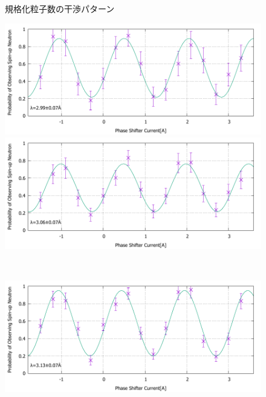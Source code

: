 \begin{figure}[h]
\begin{minipage}{0.5\hsize}
\end{minipage}
\caption{規格化粒子数の干渉パターン}\label{Discussion_fig_IF_nb}
\end{figure}

\begin{figure}[h]
\begin{minipage}{0.5\hsize}
\includegraphics[width=\hsize]{discussion/IF_rb/Interference_rb_fit420.pdf}
\end{minipage}
\begin{minipage}{0.5\hsize}
\includegraphics[width=\hsize]{discussion/IF_rb/Interference_rb_fit430.pdf}
\end{minipage}\\
\begin{minipage}{0.5\hsize}
\includegraphics[width=\hsize]{discussion/IF_rb/Interference_rb_fit440.pdf}
\end{minipage}

\end{figure}
